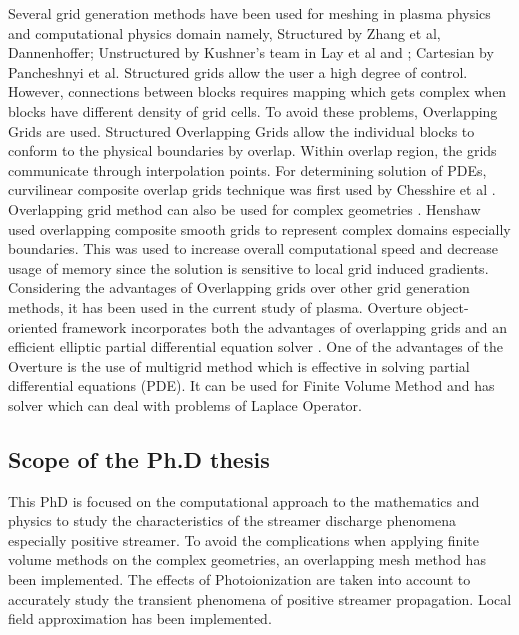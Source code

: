\documentclass{article}
\begin{document}
Several grid generation methods have been used for meshing in plasma physics and computational physics domain namely, Structured by Zhang et al\cite{Zhang2013CompositeGeometries}, Dannenhoffer\cite{DANNENHOFFERIII1991AGeometries}; Unstructured by Kushner's team in Lay et al\cite{Lay2003BreakdownLamps} and \cite{Babaeva2006StreamerParticles}; Cartesian by Pancheshnyi et al\cite{Pancheshnyi2008NumericalRefinement}. Structured grids allow the user a high degree of control. However, connections between blocks requires mapping which gets complex when blocks have different density of grid cells. To avoid these problems, Overlapping Grids are used. Structured Overlapping Grids allow the individual blocks to conform to the physical boundaries by overlap. Within overlap region, the grids communicate through interpolation points. For determining solution of PDEs, curvilinear composite overlap grids technique was first used by Chesshire et al \cite{Chesshire1990CompositeEquations}. Overlapping grid method can also be used for complex geometries \cite{Baker1992MeshShapes}. Henshaw \cite{Henshaw2003AnGrids} used overlapping composite smooth grids to represent complex domains especially boundaries. This was used to increase overall computational speed and decrease usage of memory since the solution is sensitive to local grid induced gradients. Considering the advantages of Overlapping grids over other grid generation methods, it has been used in the current study of plasma. Overture object-oriented framework incorporates both the advantages of overlapping grids and an efficient elliptic partial differential equation solver \cite{Henshaw2005OnGrids}. One of the advantages of the Overture is the use of multigrid method which is effective in solving partial differential equations (PDE). It can be used for Finite Volume Method and has solver which can deal with problems of Laplace Operator.

\subsection{Scope of the Ph.D thesis}
This PhD is focused on the computational approach to the mathematics and physics to study the characteristics of the streamer discharge phenomena especially positive streamer. To avoid the complications when applying finite volume methods on the complex geometries, an overlapping mesh method has been implemented. The effects of Photoionization are taken into account to accurately study the transient phenomena of positive streamer propagation. Local field approximation has been implemented. 
\end{document}
